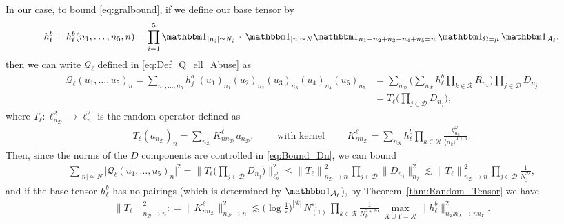 \documentclass[11pt, xcolor = dvipsnames,reqno
]{amsart}
\theoremstyle{definition}
\theoremstyle{remark}
\begin{document}
In our case, to bound \eqref{eq:gralbound}, 
if we define our base tensor by
\begin{align}\label{eq:basetensor-def}
    h^b_\ell 
    = h^b_\ell(n_1, \ldots, n_5,n)
    = \prod_{i=1}^5 \mathbbm 1_{|n_i| \simeq N_i} \, \cdot \, \mathbbm 1_{|n| \simeq N}
    \mathbbm 1_{n_1 - n_2 + n_3 - n_4 + n_5 = n} \,\mathbbm 1_{\Omega = \mu} \, \mathbbm 1_{\mathcal{A}_\ell},
\end{align}
then we can write $\mathcal{Q}_\ell$ defined in \eqref{eq:Def_Q_ell_Abuse} as
\begin{align}\label{eq:Our_Quantity_As_A_Tensor}
    \mathcal{Q}_\ell(u_1, \ldots, u_5)_n
    = \sum_{n_1, \ldots, n_5} h^b_j \, \,  (u_1)_{n_1} \overline{(u_2)_{n_2}} (u_3)_{n_3} \overline{(u_4)_{n_4}} (u_5)_{n_5}  
    & = \sum_{n_\mathcal{D}} \bigg( \sum_{n_\mathcal{R}} h^b_\ell \prod_{k \in \mathcal{R}} R_{n_k}  \bigg) \prod_{j \in \mathcal{D}} D_{n_j} \nonumber \\
    & = T_\ell \Big( \prod_{j \in \mathcal D} D_{n_j} \Big),
\end{align}
where $T_\ell : \ell^2_{n_{\mathcal{D}}} \rightarrow \ell^2_n$ is the random operator defined as
\begin{align}\label{eq:Kernel_RT}
    T_\ell (a_{n_{\mathcal{D}}})_n =
    \sum_{n_\mathcal{D}} K^\ell_{n n_{\mathcal{D}}} \, a_{n_{\mathcal D}}, 
    \qquad \text{ with kernel } \qquad 
    K^\ell_{n n_{\mathcal{D}}} 
    = \sum_{n_\mathcal{R}} h^b_\ell \prod_{k \in \mathcal{R}} \frac{g_{n_k}^{\omega}}{\langle n_k \rangle^{1 + \alpha}}.
\end{align}
Then, since the norms of the $D$ components are controlled in \eqref{eq:Bound_Dn}, we can bound
\begin{align}\label{eq:btensor-intro}
    \sum_{|n| \simeq N}  \big| \mathcal{Q}_\ell(u_1, \ldots, u_5)_n \big|^2 
    = \Big\lVert T_\ell \Big( \prod_{j \in \mathcal D} D_{n_j} \Big) \Big\rVert_{\ell_n^2}^2 
    \leq 
    \left\| 
    T_\ell\right\|_{n_{\mathcal{D}} \rightarrow n}^2  \, 
    \prod_{j \in \mathcal{D}} \|D_{n_j}\|_{n_j}^2
    \lesssim 
    \left\| 
    T_\ell\right\|_{n_{\mathcal{D}} \rightarrow n}^2  \, 
    \prod_{j \in \mathcal{D}} \frac{1}{N_j^{2s}}, 
\end{align}
and if the base tensor $h^b_\ell$ has no pairings (which is determined by $\mathbbm 1_{\mathcal A_\ell}$), 
by Theorem~\ref{thm:Random_Tensor} we have
\begin{align} 
    \left\| 
    T_\ell\right\|_{n_{\mathcal{D}} \rightarrow n}^2 
    : = \big\| 
    K^\ell_{nn_{\mathcal D} } \big\|_{n_{\mathcal{D}} \rightarrow n}^2
    \lesssim 
    \Big( \log \frac{1}{\varepsilon} \Big)^{|\mathcal R|} \, 
    N_{(1)}^{\varepsilon_1} \, 
    \prod_{k \in \mathcal{R}} \frac{1}{ N_{k}^{2 + 2\alpha}}  \, 
    \max_{X \dot\cup Y = \mathcal R} 
    \| h^b_\ell \|_{n_{\mathcal{D}} n_X \rightarrow n n_Y}^2. 
\end{align}
\end{document}
